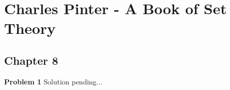 \documentclass{article}
\begin{document}
\section*{Charles Pinter - A Book of Set Theory}
\subsection*{Chapter 8}

\textbf{Problem 1}
Solution pending...
\end{document}
